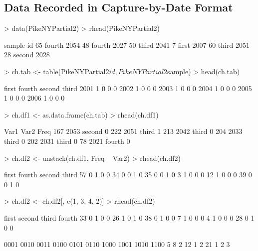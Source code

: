 \documentclass[a4paper]{article}
\begin{document}
\subsection{Data Recorded in Capture-by-Date Format}
\begin{Schunk}
\begin{Sinput}
> data(PikeNYPartial2)
> rhead(PikeNYPartial2)
\end{Sinput}
\begin{Soutput}
   sample   id
65 fourth 2054
48 fourth 2027
50  third 2041
7   first 2007
60  third 2051
28 second 2028
\end{Soutput}
\begin{Sinput}
> ch.tab <- table(PikeNYPartial2$id, PikeNYPartial2$sample)
> head(ch.tab)
\end{Sinput}
\begin{Soutput}
       first fourth second third
  2001     1      0      0     0
  2002     1      0      0     0
  2003     1      0      0     0
  2004     1      0      0     0
  2005     1      0      0     0
  2006     1      0      0     0
\end{Soutput}
\begin{Sinput}
> ch.df1 <- as.data.frame(ch.tab)
> rhead(ch.df1)
\end{Sinput}
\begin{Soutput}
    Var1   Var2 Freq
167 2053 second    0
222 2051  third    1
213 2042  third    0
204 2033  third    0
202 2031  third    0
78  2021 fourth    0
\end{Soutput}
\begin{Sinput}
> ch.df2 <- unstack(ch.df1, Freq ~ Var2)
> rhead(ch.df2)
\end{Sinput}
\begin{Soutput}
   first fourth second third
57     0      1      0     0
34     0      0      1     0
35     0      0      1     0
3      1      0      0     0
12     1      0      0     0
39     0      0      1     0
\end{Soutput}
\begin{Sinput}
> ch.df2 <- ch.df2[, c(1, 3, 4, 2)]
> rhead(ch.df2)
\end{Sinput}
\begin{Soutput}
   first second third fourth
33     0      1     0      0
26     1      0     1      0
38     0      1     0      0
7      1      0     0      0
4      1      0     0      0
28     0      1     0      0
\end{Soutput}
\begin{Soutput}
0001 0010 0011 0100 0101 0110 1000 1001 1010 1100
   5    8    2   12    1    2   21    1    2    3
\end{Soutput}
\end{Schunk}
\end{document}
